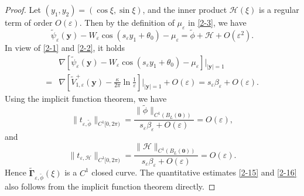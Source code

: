 \documentclass[12pt,reqno]{amsart}
\numberwithin{equation}{section}
\theoremstyle{definition}
\theoremstyle{remark}
\newcommand{\ep}{\varepsilon}
\begin{document}
	\begin{proof}
		Let $(y_1,y_2)=(\cos\xi,\sin\xi)$, and the inner product $\mathcal H(\xi)$ is a regular term of order $O(\varepsilon)$. Then by the definition of $\mu_\varepsilon$ in \eqref{2-3}, we have
		\begin{equation*}
			\tilde\psi_\varepsilon(\boldsymbol y)-W_\ep\cos(s_\varepsilon y_1+\theta_0)-\mu_\varepsilon=\tilde\phi+\mathcal H+O(\varepsilon^2).
		\end{equation*} 
		In view of \eqref{2-1} and \eqref{2-2}, it holds
		\begin{align*}
			&\nabla\left[\tilde\psi_\varepsilon(\boldsymbol y)-W_\ep\cos(s_\varepsilon y_1+\theta_0)-\mu_\varepsilon\right]\bigg|_{|\boldsymbol y|=1}\\
			=&\nabla\left[\tilde V^+_{1,\varepsilon}(\boldsymbol y)-\frac{\kappa}{2\pi}\ln\frac{1}{\varepsilon}\right]\bigg|_{|\boldsymbol y|=1}+O(\varepsilon)=s_\varepsilon\beta_\varepsilon+O(\varepsilon).
		\end{align*}
		Using the implicit function theorem, we have 
		$$\|t_{\varepsilon,\tilde\phi}\|_{C^1[0,2\pi)}=\frac{\| \tilde\phi\|_{C^1(B_L(\boldsymbol 0))}}{s_\varepsilon\beta_\varepsilon+O(\varepsilon)}=O(\varepsilon),$$ 
		and 
		$$\|t_{\varepsilon,\mathcal H}\|_{C^1[0,2\pi)}=\frac{\|\mathcal H\|_{C^1(B_L(\boldsymbol 0))}}{s_\varepsilon\beta_\varepsilon+O(\varepsilon)}=O(\varepsilon).$$
		Hence $\tilde{\mathbf\Gamma}_{\varepsilon,\tilde\phi}(\xi)$ is a $C^1$ closed curve. The quantitative estimates \eqref{2-15} and \eqref{2-16} also follows from the implicit function theorem directly.
	\end{proof}
	
\end{document}
